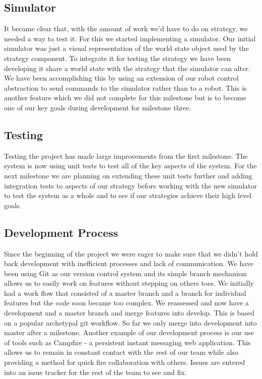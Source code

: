 \documentclass[12pt, a4paper, titlepage]{article}
\begin{document}
\subsection{Simulator}

It became clear that, with the amount of work we'd have to do on strategy,
we needed a way to test it. For this we started implementing a simulator. Our
initial simulator was just a visual representation of the world state object
used by the strategy component. To integrate it for testing the strategy we have
been developing it share a world state with the strategy that the simulator
can alter. We have been accomplishing this by using an extension of our robot
control abstraction to send commands to the simulator rather than to a robot.
This is another feature which we did not complete for this milestone but is to
become one of our key goals during development for milestone three.

\subsection{Testing}

Testing the project has made large improvements from the first milestone. The
system is now using unit tests to test all of the key aspects of the system. For
the next milestone we are planning on extending these unit tests further and
adding integration tests to aspects of our strategy before working with the new
simulator to test the system as a whole and to see if our strategies achieve
their high level goals.

\subsection{Development Process}

Since the beginning of the project we were eager to make sure that we didn't
hold back development with inefficient processes and lack of communication.
We have been using Git\cite{git-scm} as our version control system and its
simple branch mechanism allows us to easily work on features without stepping
on others toes. We initially had a work flow that consisted of a master branch
and a branch for individual features but the code soon became too complex. We
reassessed and now have a development and a master branch and merge features
into develop. This is based on a popular archetypal git workflow. So far we
only merge into development into master after a milestone. Another example of
our development process is our use of tools such as Campfire\cite{campfire} -
a persistent instant messaging web application. This allows us to remain in
constant contact with the rest of our team while also providing a method for
quick fire collaboration with others. Issues are entered into an issue tracker
for the rest of the team to see and fix.
\end{document}
